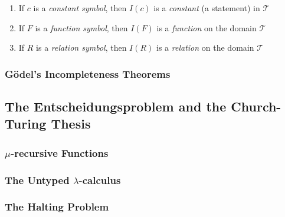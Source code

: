 \begin{enumerate}
	\item If $c$ is a \textit{constant symbol}, then $I(c)$ is a \textit{constant} (a statement) in $\mathcal{T}$
	\item If $F$ is a \textit{function symbol}, then $I(F)$ is a \textit{function} on the domain $\mathcal{T}$
	\item If $R$ is a \textit{relation symbol}, then $I(R)$ is a \textit{relation} on the domain $\mathcal{T}$
\end{enumerate}

\subsubsection{G\"odel's Incompleteness Theorems}






\subsection{The Entscheidungsproblem and the Church-Turing Thesis}

\subsubsection{$\mu$-recursive Functions}

\subsubsection{The Untyped $\lambda$-calculus}

\subsubsection{The Halting Problem}




